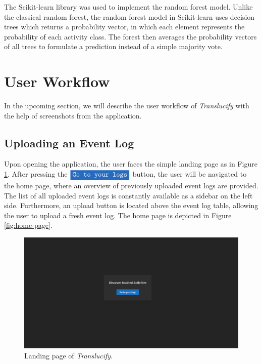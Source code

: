 The Scikit-learn library was used to implement the random forest model. Unlike the classical random forest, the random forest model in Scikit-learn uses decision trees which returns a probability vector, in which each element represents the probability of each activity class. The forest then averages the probability vectors of all trees to formulate a prediction instead of a simple majority vote.

\section{User Workflow}

In the upcoming section, we will describe the user workflow of \emph{Translucify} with the help of screenshots from the application.

\subsection{Uploading an Event Log}

Upon opening the application, the user faces the simple landing page as in Figure \ref{fig:landing-page}. After pressing the $\colorbox{NavyBlue}{\textcolor{white}{\texttt{Go to your logs}}}$ button, the user will be navigated to the home page, where an overview of previously uploaded event logs are provided. The list of all uploaded event logs is constantly available as a sidebar on the left side. Furthermore, an upload button is located above the event log table, allowing the user to upload a fresh event log. The home page is depicted in Figure \ref{fig:home-page}.

\begin{figure}[H]
    \centering
    \includegraphics[width=\textwidth]{figures/screenshots/landing.png}
    \caption{Landing page of \emph{Translucify}.}
    \label{fig:landing-page}
\end{figure}

